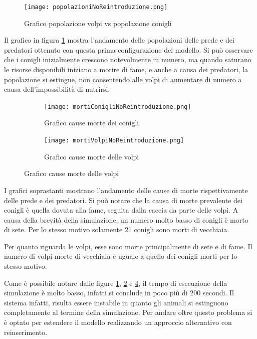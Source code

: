 \documentclass[11pt]{article}
\begin{document}
\begin{figure}[h!]
     \centering
     \texttt{[image: popolazioniNoReintroduzione.png]}
     \caption{Grafico popolazione volpi vs popolazione conigli}
     \label{fig:coniglioVolpeNoReintroduzione}
\end{figure}

Il grafico in figura \ref{fig:coniglioVolpeNoReintroduzione} mostra l'andamento delle popolazioni delle prede e dei predatori ottenuto con questa prima configurazione del modello. Si può osservare che i conigli inizialmente crescono notevolmente in numero, ma quando saturano le risorse disponibili iniziano a morire di fame, e anche a causa dei predatori, la popolazione si estingue, non consentendo alle volpi di aumentare di numero a causa dell'impossibilità di nutrirsi. 


\begin{figure}[h!]
	\hspace{-12mm}
	\begin{subfigure}{.5\textwidth}
            \centering
            \texttt{[image: mortiConigliNoReintroduzione.png]}
            \caption{Grafico cause morte dei conigli}
            \label{fig:morteConiglioReintroduzione}
	\end{subfigure}
		\hspace{5mm}
		\begin{subfigure}{.5\textwidth}
		
		\centering
        \texttt{[image: mortiVolpiNoReintroduzione.png]}
        \caption{Grafico cause morte delle volpi}
        \label{fig:morteVolpeNoReintroduzione}
	\end{subfigure}
\end{figure}

I grafici soprastanti mostrano l'andamento delle cause di morte rispettivamente delle prede e dei predatori. Si può notare che la causa di morte prevalente dei conigli è quella dovuta alla fame, seguita dalla caccia da parte delle volpi. A causa della brevità della simulazione, un numero molto basso di conigli è morto di sete. Per lo stesso motivo solamente 21 conigli sono morti di vecchiaia. 

Per quanto riguarda le volpi, esse sono morte principalmente di sete e di fame. Il numero di volpi morte di vecchiaia è uguale a quello dei conigli morti per lo stesso motivo. 

\vspace{0.5cm}

\noindent Come è possibile notare dalle figure \ref{fig:coniglioVolpeNoReintroduzione}, \ref{fig:morteConiglioReintroduzione} e \ref{fig:morteVolpeNoReintroduzione}, il tempo di esecuzione della simulazione è molto basso, infatti si conclude in poco più di 200 secondi. Il sistema infatti, risulta essere instabile in quanto gli animali si estinguono completamente al termine della simulazione. 
Per andare oltre questo problema si è optato per estendere il modello realizzando un approccio alternativo con reinserimento.
\end{document}
